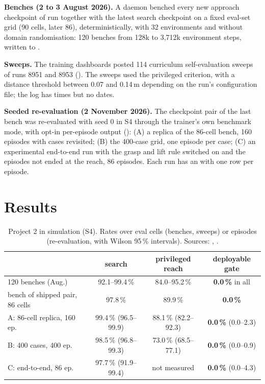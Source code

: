 \documentclass[conference,10pt]{IEEEtran}
\begin{document}
\textbf{Benches (2 to 3 August 2026).} A daemon benched every new approach checkpoint of run
 together with the latest search checkpoint on a fixed eval-set grid (90 cells, later 86),
deterministically, with 32 environments and without domain randomisation: 120 benches from 128k to 3,712k
environment steps, written to .

\textbf{Sweeps.} The training dashboards posted 114 curriculum self-evaluation sweeps of runs 8951 and 8953
(). The sweeps used the privileged criterion, with a distance threshold between 0.07 and 0.14\,m
depending on the run's configuration file; the log has times but no dates.

\textbf{Seeded re-evaluation (2 November 2026).} The checkpoint pair of the last bench was re-evaluated with seed 0 in
S4 through the trainer's own benchmark mode, with opt-in per-episode output
(): (A) a replica of the 86-cell bench, 160 episodes with cases revisited; (B) the
400-case grid, one episode per case; (C) an experimental end-to-end run with the grasp and lift rule switched on and the
episodes not ended at the reach, 86 episodes. Each run has an  with one row per episode.

\section{Results}\label{sec:results}
\begin{table}[t]
\centering
\caption{Project 2 in simulation (S4). Rates over eval cells (benches, sweeps) or episodes (re-evaluation, with
Wilson 95\,\% intervals). Sources: \protect{}, \protect{}.}
\label{tab:results}
\setlength{\tabcolsep}{5pt}
\begin{tabular}{@{}lccc@{}}
\toprule
 & search & privileged reach & deployable gate \\
\midrule
120 benches (Aug.) & 92.1--99.4\,\% & 84.0--95.2\,\% & \textbf{0.0\,\%} in all \\
bench of shipped pair, 86 cells & 97.8\,\% & 89.9\,\% & \textbf{0.0\,\%} \\
\midrule
A: 86-cell replica, 160 ep. & 99.4\,\% (96.5--99.9) & 88.1\,\% (82.2--92.3) & \textbf{0.0\,\%} (0.0--2.3) \\
B: 400 cases, 400 ep. & 98.5\,\% (96.8--99.3) & 73.0\,\% (68.5--77.1) & \textbf{0.0\,\%} (0.0--0.9) \\
C: end-to-end, 86 ep. & 97.7\,\% (91.9--99.4) & not measured & \textbf{0.0\,\%} (0.0--4.3) \\
\bottomrule
\end{tabular}
\end{table}
\end{document}
